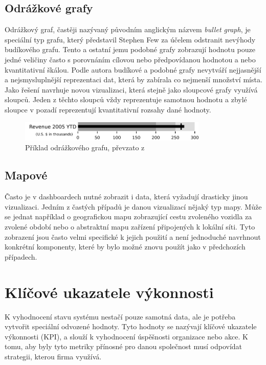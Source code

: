 \subsection*{Odrážkové grafy}
Odrážkový graf, častěji nazývaný původním anglickým názvem \textit{bullet graph}, je speciální typ grafu, který představil Stephen Few \cite{few2004dashboard} za účelem odstranit nevýhody budíkového grafu. Tento a ostatní jemu podobné grafy zobrazují hodnotu pouze jedné veličiny často s porovnáním cílovou nebo předpovídanou hodnotou a nebo kvantitativní škálou. Podle autora budíkové a podobné grafy nevytváří nejjasnější a nejsmysluplnější reprezentaci dat, která by zabírala co nejmenší množství místa. Jako řešení navrhuje novou vizualizaci, která stejně jako sloupcové grafy využívá sloupců. Jeden z těchto sloupců vždy reprezentuje samotnou hodnotu a zbylé sloupce v pozadí reprezentují kvantitativní rozsahy dané hodnoty.

\begin{figure}[H]
\label{question4}
\begin{center}
    \includegraphics[width=0.8\textwidth]{obrazky-figures/Bullet_Graph_Example.pdf}
\end{center}
\caption{Příklad odrážkového grafu, převzato z \cite{few2004dashboard}}
\end{figure}

\subsection{Mapové}
Často je v dashboardech nutné zobrazit i data, která vyžadují drasticky jinou vizualizaci. Jedním z častých případů je danou vizualizací nějaký typ mapy. Může se jednat například o geografickou mapu zobrazující cestu zvoleného vozidla za zvolené období nebo o abstraktní mapu zařízení připojených k lokální síti. Tyto zobrazení jsou často velmi specifické k jejich použití a není jednoduché navrhnout konkrétní komponenty, které by bylo možné znovu použít jako v předchozích případech. 

\section{Klíčové ukazatele výkonnosti}
K vyhodnocení stavu systému nestačí pouze samotná data, ale je potřeba vytvořit speciální odvozené hodnoty. Tyto hodnoty se nazývají klíčové ukazatele výkonnosti (KPI), a slouží k vyhodnocení úspěšnosti organizace nebo akce. K tomu, aby byly tyto metriky přínosné pro danou společnost musí odpovídat strategii, kterou firma využívá. 

